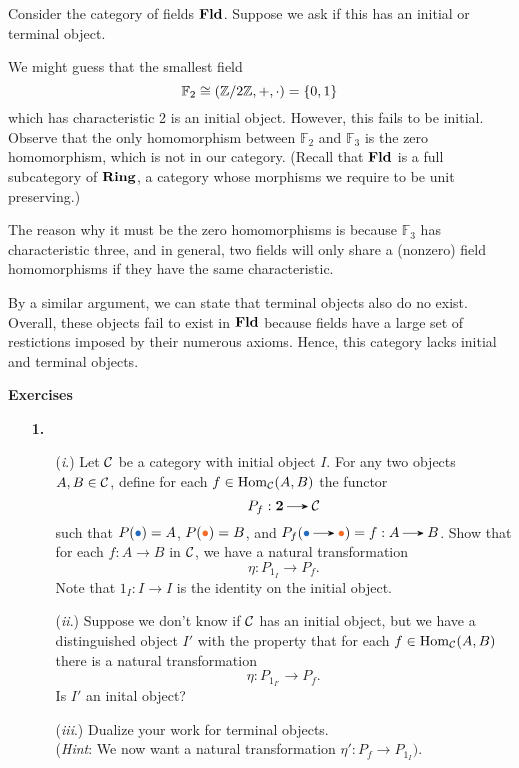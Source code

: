     \begin{example}
        Consider the category of fields $\operatorname{\mathbf{Fld}}$. Suppose we ask if this has an initial 
        or terminal object. 

        We might guess that the smallest field 
        \[
            \mathbb{F}_2 \cong (\mathbb{Z}/2\mathbb{Z}, +, \cdot) = \{0, 1\} 
        \]
        which has characteristic 2 is an initial object. However, this fails to be initial. 
        Observe that the only homomorphism between $\mathbb{F}_2$ and $\mathbb{F}_3$ is the zero 
        homomorphism, which is not in our category. (Recall that $\operatorname{\mathbf{Fld}}$ is a full subcategory 
        of $\operatorname{\mathbf{Ring}}$, a category whose morphisms we require to be unit preserving.)
        
        The reason why it must be the zero homomorphisms is because $\mathbb{F}_3$ has characteristic three, 
        and in general, two fields will only share a (nonzero) field homomorphisms if they 
        have the same characteristic. 

        By a similar argument, we can state that terminal objects also do no exist. Overall, 
        these objects fail to exist in $\operatorname{\mathbf{Fld}}$ because fields have a large set of 
        restictions imposed by their numerous axioms.
        Hence, this category lacks initial and terminal objects.
    \end{example}

    {\large \textbf{Exercises}
    \vspace{0.5cm}} 
    \begin{itemize}
        \item[\textbf{1.}] 
        \begin{itemize}
            \item[(\emph{i}.)] Let $\mathcal{C}$ be a category with initial object $I$. 
            For any two objects $A, B \in \mathcal{C}$, define for each $f \in \operatorname{\mathrm{Hom}}_{\mathcal{C}}(A, B)$
            the functor
            \[
                P_f: \textbf{2} \to \cc
            \] 
            such that $P(\textcolor{NavyBlue}{\bullet}) = A$, $P(\textcolor{Orange}{\bullet}) = B$, 
            and $P_f(\textcolor{NavyBlue}{\bullet} \to \textcolor{Orange}{\bullet}) = f: A \to B$. 
            Show that for each $f: A \to B$ in $\mathcal{C}$, we have a natural transformation 
            \[
                \eta: P_{1_I} \to P_f.
            \]
            Note that $1_I: I \to I$ is the identity on the initial object.
            \item[(\emph{ii}.)]
            Suppose we don't know if $\mathcal{C}$ has an initial object, 
            but we have a distinguished object 
            $I'$ with the property that for each $f \in \operatorname{\mathrm{Hom}}_{\mathcal{C}}(A,B)$ there is a natural 
            transformation 
            \[
                \eta: P_{1_{I'}} \to P_f.
            \]
            Is $I'$ an inital object?

            \item[(\emph{iii}.)] Dualize your work for terminal objects.\\
            (\emph{Hint}: We now want a natural transformation $\eta': P_f \to P_{1_I})$.  
        \end{itemize}

    \end{itemize}

    